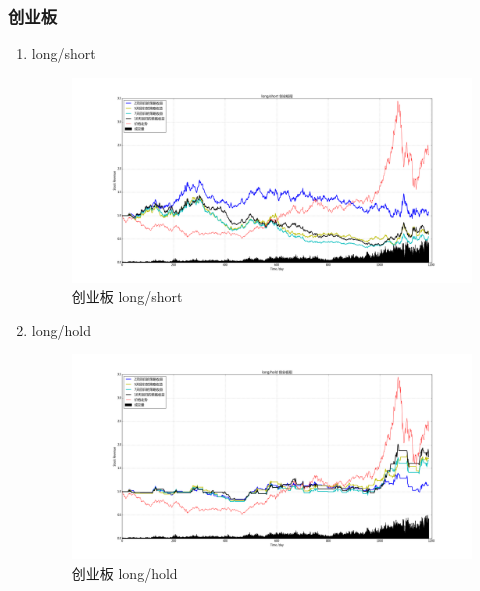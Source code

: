 \documentclass[12pt,a4paper]{article}
\begin{document}
\subsubsection{创业板}
\begin{enumerate}
\item long/short 
\begin{figure}[H]
	\centering
	\includegraphics[width=1.0\textwidth]{img_r_10/cyb.png}
	\caption{创业板 long/short}
\end{figure}
\item long/hold 
\begin{figure}[H]
	\centering
	\includegraphics[width=1.0\textwidth]{img_r_10/cyb_1.png}
	\caption{创业板 long/hold }
\end{figure}
\end{enumerate}
\end{document}
